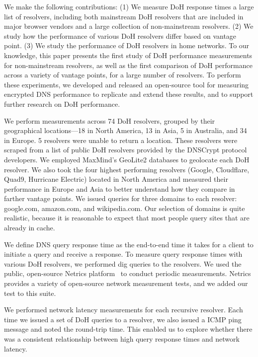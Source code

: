 We make the following contributions: (1) We measure DoH response times a large list of resolvers, including both mainstream DoH resolvers that are included in major browser vendors and a large collection of non-mainstream resolvers. (2) We study how the performance of various DoH resolvers differ based on vantage point. (3) We study the performance of DoH resolvers in home networks. To our knowledge, this paper presents the first study of DoH performance measurements for non-mainstream resolvers, as well as the first comparison of DoH performance across a variety of vantage points, for a large number of resolvers. To perform these experiments, we developed and released an open-source tool for measuring encrypted DNS performance to replicate and extend these results, and to support further research on DoH performance.

We perform measurements across 74 DoH resolvers, grouped by their geographical locations—18 in North America, 13 in Asia, 5 in Australia, and 34 in Europe. 5 resolvers were unable to return a location. These resolvers were scraped from a list of public DoH resolvers provided by the DNSCrypt protocol developers. We employed MaxMind’s GeoLite2 databases to geolocate each DoH resolver. We also took the four highest performing resolvers (Google, Cloudflare, Quad9, Hurricane Electric) located in North America and measured their performance in Europe and Asia to better understand how they compare in farther vantage points. We issued queries for three domains to each resolver: google.com, amazon.com, and wikipedia.com. Our selection of domains is quite realistic, because it is reasonable to expect that most people query sites that are already in cache. 

We define DNS query response time as the
end-to-end time it takes for a client to initiate a query and receive a
response.  To measure query response times with various DoH resolvers, we
performed dig queries to the resolvers. We used the public, open-source Netrics
platform~\cite{netrics} to conduct periodic measurements. Netrics
provides a variety of open-source network measurement tests, and we added our 
test to this suite. 

We performed network latency measurements for each recursive resolver.  Each time
we issued a set of DoH queries to a resolver, we also issued a ICMP ping
message and noted the round-trip time.  This enabled us to explore
whether there was a consistent relationship between high query response times
and network latency.

